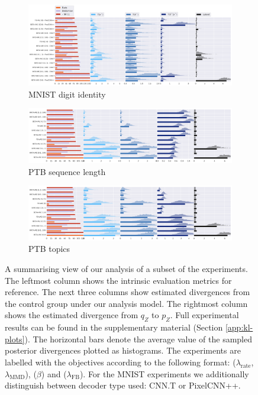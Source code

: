 \begin{figure}[ht]
     \centering
     \begin{subfigure}{\textwidth}
         \centering
         \includegraphics[width=\textwidth]{images/kl_plots/mnist_selection_True.png}
         \caption{MNIST digit identity}
         \label{fig:all-kl-plots-sub-mnist}
     \end{subfigure}
     \begin{subfigure}{\textwidth}
         \centering
         \includegraphics[width=\textwidth]{images/kl_plots/ptb_sequence_len_selection_True.png}
         \caption{PTB sequence length}
         \label{fig:all-kl-plots-sub-ptb-seq-len}
     \end{subfigure}
     \begin{subfigure}{\textwidth}
         \centering
        \includegraphics[width=\textwidth]{images/kl_plots/ptb_topics_selection_True.png}
         \caption{PTB topics}
         \label{fig:all-kl-plots-sub-ptb-topics}
     \end{subfigure}
        \caption{A summarising view of our analysis of a subset of the experiments. The leftmost column shows the intrinsic evaluation metrics for reference. The next three columns show estimated divergences from the control group under our analysis model. The rightmost column shows the estimated divergence from $q_Z$ to $p_Z$. Full experimental results can be found in the supplementary material (Section \ref{app:kl-plots}). The horizontal bars denote the average value of the sampled posterior divergences plotted as histograms. The experiments are labelled with the objectives according to the following format: \infovae ($\lambda_{\text{rate}}$, $\lambda_{\text{MMD}}$), \betavae ($\beta$) and \fbvae ($\lambda_{\text{FB}}$). For the MNIST experiments we additionally distinguish between decoder type used: CNN.T or PixelCNN++.}
        \label{fig:all-kl-plots}
\end{figure}

